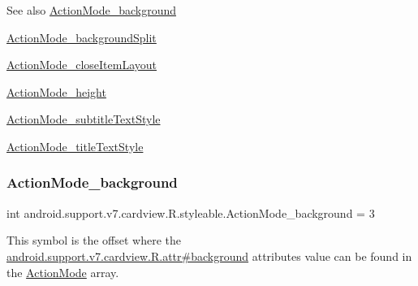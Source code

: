 \begin{DoxySeeAlso}{See also}
\hyperlink{classandroid_1_1support_1_1v7_1_1cardview_1_1R_1_1styleable_a827ccfc36023037b85ac808303415574}{Action\+Mode\+\_\+background} 

\hyperlink{classandroid_1_1support_1_1v7_1_1cardview_1_1R_1_1styleable_a1ff81fea394e8d3fc2d0bac1f401a6b3}{Action\+Mode\+\_\+background\+Split} 

\hyperlink{classandroid_1_1support_1_1v7_1_1cardview_1_1R_1_1styleable_ad542200fde77c9d47f12726ea555d1ae}{Action\+Mode\+\_\+close\+Item\+Layout} 

\hyperlink{classandroid_1_1support_1_1v7_1_1cardview_1_1R_1_1styleable_a5e1ce0fbbed4e137f757b2513a06826c}{Action\+Mode\+\_\+height} 

\hyperlink{classandroid_1_1support_1_1v7_1_1cardview_1_1R_1_1styleable_a4e31cf5933cdeb00f2f52de225b74ceb}{Action\+Mode\+\_\+subtitle\+Text\+Style} 

\hyperlink{classandroid_1_1support_1_1v7_1_1cardview_1_1R_1_1styleable_a92d5caac9795b056f4da8a56c8588ee3}{Action\+Mode\+\_\+title\+Text\+Style} 
\end{DoxySeeAlso}
\mbox{\label{classandroid_1_1support_1_1v7_1_1cardview_1_1R_1_1styleable_a827ccfc36023037b85ac808303415574}} 
\subsubsection{\texorpdfstring{Action\+Mode\+\_\+background}{ActionMode\_background}}
{\footnotesize\ttfamily int android.\+support.\+v7.\+cardview.\+R.\+styleable.\+Action\+Mode\+\_\+background = 3\hspace{0.3cm}{\ttfamily [static]}}

This symbol is the offset where the \hyperlink{classandroid_1_1support_1_1v7_1_1cardview_1_1R_1_1attr_a2c3c88c05e2e1f352d9729fda30281ac}{android.\+support.\+v7.\+cardview.\+R.\+attr\#background} attribute\textquotesingle{}s value can be found in the \hyperlink{classandroid_1_1support_1_1v7_1_1cardview_1_1R_1_1styleable_aadab2db6f0b961c9bad3b28abb49a9b0}{Action\+Mode} array.


